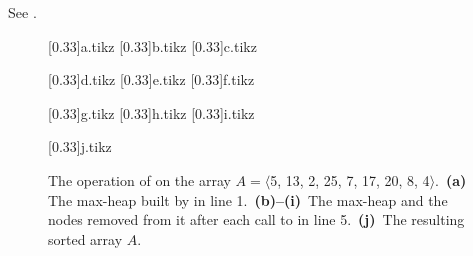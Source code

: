See .
\begin{figure}[htb]
    \hspace*{-1.5cm}
    \newlength{\figurewidth}\setlength{\figurewidth}{\textwidth+1.5cm}
    \begin{minipage}{\figurewidth}
        \subcaptionbox{\label{fig:6.4-1a}}[0.33\figurewidth]{{a.tikz}}
        \subcaptionbox{\label{fig:6.4-1b}}[0.33\figurewidth]{{b.tikz}}
        \subcaptionbox{\label{fig:6.4-1c}}[0.33\figurewidth]{{c.tikz}}
        \par\vspace{4ex}
        \subcaptionbox{\label{fig:6.4-1d}}[0.33\figurewidth]{{d.tikz}}
        \subcaptionbox{\label{fig:6.4-1e}}[0.33\figurewidth]{{e.tikz}}
        \subcaptionbox{\label{fig:6.4-1f}}[0.33\figurewidth]{{f.tikz}}
        \par\vspace{4ex}
        \subcaptionbox{\label{fig:6.4-1g}}[0.33\figurewidth]{{g.tikz}}
        \subcaptionbox{\label{fig:6.4-1h}}[0.33\figurewidth]{{h.tikz}}
        \subcaptionbox{\label{fig:6.4-1i}}[0.33\figurewidth]{{i.tikz}}
        \par\vspace{4ex}
        \subcaptionbox{\label{fig:6.4-1j}}[0.33\figurewidth]{{j.tikz}}
    \end{minipage}
    \caption{The operation of  on the array $A=\langle$5, 13, 2, 25, 7, 17, 20, 8, 4$\rangle$.\,
    \textbf{(a)}\, The max-heap built by  in line 1.\,
    \textbf{(b)--(i)}\, The max-heap and the nodes removed from it after each call to  in line 5.\,
    \textbf{(j)}\, The resulting sorted array $A$.} \label{fig:6.4-1}
\end{figure}
